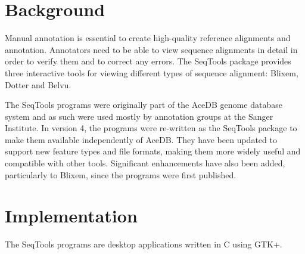 \documentclass[10pt]{bmc_article}
\newenvironment{bmcformat}{\begin{raggedright}\baselineskip20pt\sloppy\setboolean{publ}{false}}{\end{raggedright}\baselineskip20pt\sloppy}
\begin{document}
\begin{bmcformat}








\section*{Background}
Manual annotation is essential to create high-quality reference alignments and annotation.  Annotators need to be able to view sequence alignments in detail in order to verify them and to correct any errors.  The SeqTools package provides three interactive tools for viewing different types of sequence alignment: Blixem, Dotter and Belvu.

The SeqTools programs were originally part of the AceDB\cite{Du94} genome database system and as such were used mostly by annotation groups at the Sanger Institute.  In version 4, the programs were re-written as the SeqTools package to make them available independently of AceDB.  They have been updated to support new feature types and file formats, making them more widely useful and compatible with other tools.  Significant enhancements have also been added, particularly to Blixem, since the programs were first published\cite{So94,So95,So05}.


\section*{Implementation}
The SeqTools programs are desktop applications written in C using GTK+.


\end{bmcformat}
\end{document}
